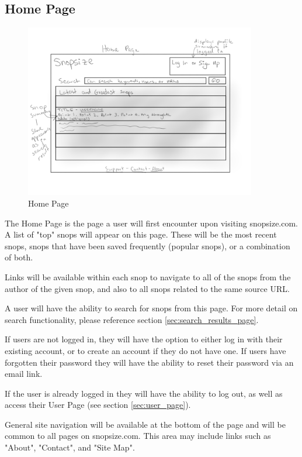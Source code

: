 \documentclass[11pt]{article}
\begin{document}
\subsection{Home Page}
\begin{figure}[htb]
\begin{center}
\includegraphics[width=0.9\textwidth]{home_page.png}
\caption{Home Page}
\label{fig:fig_home_page}
\end{center}
\end{figure}
The Home Page is the page a user will first encounter upon visiting snopsize.com. A list of "top" snops will appear on this page. These will be the most recent snops, snops that have been saved frequently (popular snops), or a combination of both.

Links will be available within each snop to navigate to all of the snops from the author of the given snop, and also to all snops related to the same source URL.

A user will have the ability to search for snops from this page. For more detail on search functionality, please reference section \ref{sec:search_results_page}. 

If users are not logged in, they will have the option to either log in with their existing account, or to create an account if they do not have one. If users have forgotten their password they will have the ability to reset their password via an email link.

If the user is already logged in they will have the ability to log out, as well as access their User Page (see section \ref{sec:user_page}). 

General site navigation will be available at the bottom of the page and will be common to all pages on snopsize.com. This area may include links such as "About", "Contact", and "Site Map".
\end{document}
